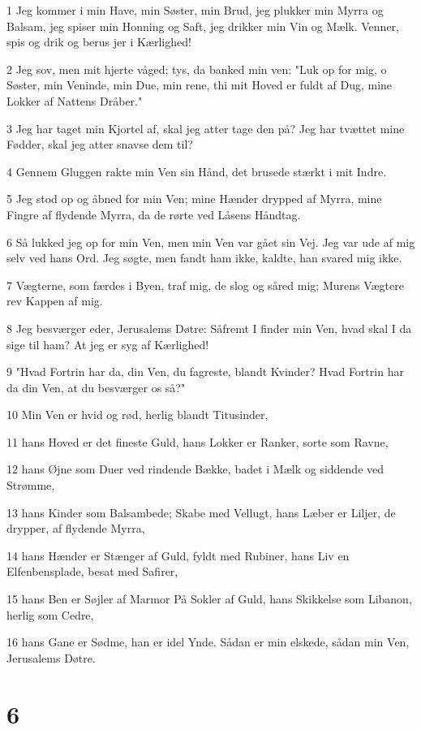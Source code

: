 \par 1 Jeg kommer i min Have, min Søster, min Brud, jeg plukker min Myrra og Balsam, jeg spiser min Honning og Saft, jeg drikker min Vin og Mælk. Venner, spis og drik og berus jer i Kærlighed!
\par 2 Jeg sov, men mit hjerte våged; tys, da banked min ven: "Luk op for mig, o Søster, min Veninde, min Due, min rene, thi mit Hoved er fuldt af Dug, mine Lokker af Nattens Dråber."
\par 3 Jeg har taget min Kjortel af, skal jeg atter tage den på? Jeg har tvættet mine Fødder, skal jeg atter snavse dem til?
\par 4 Gennem Gluggen rakte min Ven sin Hånd, det brusede stærkt i mit Indre.
\par 5 Jeg stod op og åbned for min Ven; mine Hænder drypped af Myrra, mine Fingre af flydende Myrra, da de rørte ved Låsens Håndtag.
\par 6 Så lukked jeg op for min Ven, men min Ven var gået sin Vej. Jeg var ude af mig selv ved hans Ord. Jeg søgte, men fandt ham ikke, kaldte, han svared mig ikke.
\par 7 Vægterne, som færdes i Byen, traf mig, de slog og såred mig; Murens Vægtere rev Kappen af mig.
\par 8 Jeg besværger eder, Jerusalems Døtre: Såfremt I finder min Ven, hvad skal I da sige til ham? At jeg er syg af Kærlighed!
\par 9 "Hvad Fortrin har da, din Ven, du fagreste, blandt Kvinder? Hvad Fortrin har da din Ven, at du besværger os så?"
\par 10 Min Ven er hvid og rød, herlig blandt Titusinder,
\par 11 hans Hoved er det fineste Guld, hans Lokker er Ranker, sorte som Ravne,
\par 12 hans Øjne som Duer ved rindende Bække, badet i Mælk og siddende ved Strømme,
\par 13 hans Kinder som Balsambede; Skabe med Vellugt, hans Læber er Liljer, de drypper, af flydende Myrra,
\par 14 hans Hænder er Stænger af Guld, fyldt med Rubiner, hans Liv en Elfenbensplade, besat med Safirer,
\par 15 hans Ben er Søjler af Marmor På Sokler af Guld, hans Skikkelse som Libanon, herlig som Cedre,
\par 16 hans Gane er Sødme, han er idel Ynde. Sådan er min elskede, sådan min Ven, Jerusalems Døtre.

\chapter{6}


